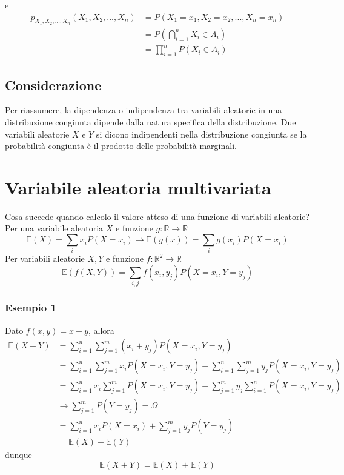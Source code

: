 \documentclass[11pt]{report}
\begin{document}
e
\begin{equation}
    \begin{split}
        p_{X_1,X_2,...,X_n}(X_1, X_2,...,X_n) & = P(X_1 = x_1, X_2 = x_2,..., X_n = x_n)\\
        & = P\left(\bigcap_{i=1}^{n}X_i \in A_i \right)\\
        & = \prod_{i=1}^{n}P(X_i \in A_i)
    \end{split}
\end{equation}
\subsection{Considerazione}
Per riassumere, la dipendenza o indipendenza tra variabili aleatorie in una distribuzione congiunta dipende dalla natura specifica della distribuzione. Due variabili aleatorie $X$ e $Y$ si dicono indipendenti nella distribuzione congiunta se la probabilità congiunta è il prodotto delle probabilità marginali.

\section{Variabile aleatoria multivariata}
Cosa succede quando calcolo il valore atteso di una funzione di variabili aleatorie?\\
Per una variabile aleatoria $X$ e funzione $g: \mathbb{R} \rightarrow \mathbb{R}$
\begin{equation}
    \mathbb{E}(X) = \sum_i x_i P(X = x_i) \rightarrow \mathbb{E}(g(x)) = \sum_i g(x_i)P(X=x_i)
\end{equation}
Per variabili aleatorie $X,Y$ e funzione $f: \mathbb{R}^2 \rightarrow \mathbb{R}$
\begin{equation}
    \mathbb{E}(f(X,Y)) = \sum_{i,j} f(x_i,y_j)P(X=x_i,Y=y_j)
\end{equation}
\subsubsection{Esempio 1}
Dato $f(x,y) = x + y$, allora
\begin{equation}
    \begin{split}
        \mathbb{E}(X + Y) & = \sum_{i=1}^n\sum_{j=1}^m(x_i + y_j)P(X=x_i,Y=y_j)\\
        & = \sum_{i=1}^n\sum_{j=1}^m x_i P(X=x_i,Y=y_j) + \sum_{i=1}^n\sum_{j=1}^m y_j P(X=x_i,Y=y_j)\\
        & = \sum_{i=1}^n x_i \sum_{j=1}^m P(X=x_i,Y=y_j) + \sum_{j=1}^m y_j \sum_{i=1}^n P(X=x_i,Y=y_j)\\
        & \rightarrow \sum_{j=1}^m P(Y=y_j) = \Omega\\
        & = \sum_{i=1}^n x_i P(X=x_i) + \sum_{j=1}^m y_j P(Y=y_j)\\
        & = \mathbb{E}(X) + \mathbb{E}(Y)
    \end{split}
\end{equation}
dunque
\begin{equation}
    \mathbb{E}(X + Y) = \mathbb{E}(X) + \mathbb{E}(Y)
\end{equation}
\end{document}
